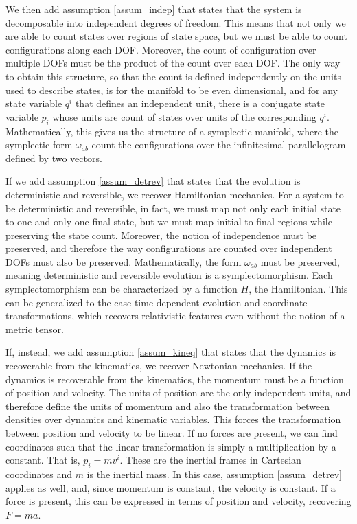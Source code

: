 We then add assumption \ref{assum_indep} that states that the system is decomposable into independent degrees of freedom. This means that not only we are able to count states over regions of state space, but we must be able to count configurations along each DOF. Moreover, the count of configuration over multiple DOFs must be the product of the count over each DOF. The only way to obtain this structure, so that the count is defined independently on the units used to describe states, is for the manifold to be even dimensional, and for any state variable $q^i$ that defines an independent unit, there is a conjugate state variable $p_i$ whose units are count of states over units of the corresponding $q^i$. Mathematically, this gives us the structure of a symplectic manifold, where the symplectic form $\omega_{ab}$ count the configurations over the infinitesimal parallelogram defined by two vectors.

If we add assumption \ref{assum_detrev} that states that the evolution is deterministic and reversible, we recover Hamiltonian mechanics. For a system to be deterministic and reversible, in fact, we must map not only each initial state to one and only one final state, but we must map initial to final regions while preserving the state count. Moreover, the notion of independence must be preserved, and therefore the way configurations are counted over independent DOFs must also be preserved. Mathematically, the form $\omega_{ab}$ must be preserved, meaning deterministic and reversible evolution is a symplectomorphism. Each symplectomorphism can be characterized by a function $H$, the Hamiltonian. This can be generalized to the case time-dependent evolution and coordinate transformations, which recovers relativistic features even without the notion of a metric tensor.

If, instead, we add assumption \ref{assum_kineq} that states that the dynamics is recoverable from the kinematics, we recover Newtonian mechanics. If the dynamics is recoverable from the kinematics, the momentum must be a function of position and velocity. The units of position are the only independent units, and therefore define the units of momentum and also the transformation between densities over dynamics and kinematic variables. This forces the transformation between position and velocity to be linear. If no forces are present, we can find coordinates such that the linear transformation is simply a multiplication by a constant. That is, $p_i = m v^i$. These are the inertial frames in Cartesian coordinates and $m$ is the inertial mass. In this case, assumption \ref{assum_detrev} applies as well, and, since momentum is constant, the velocity is constant. If a force is present, this can be expressed in terms of position and velocity, recovering $F = m a$.

